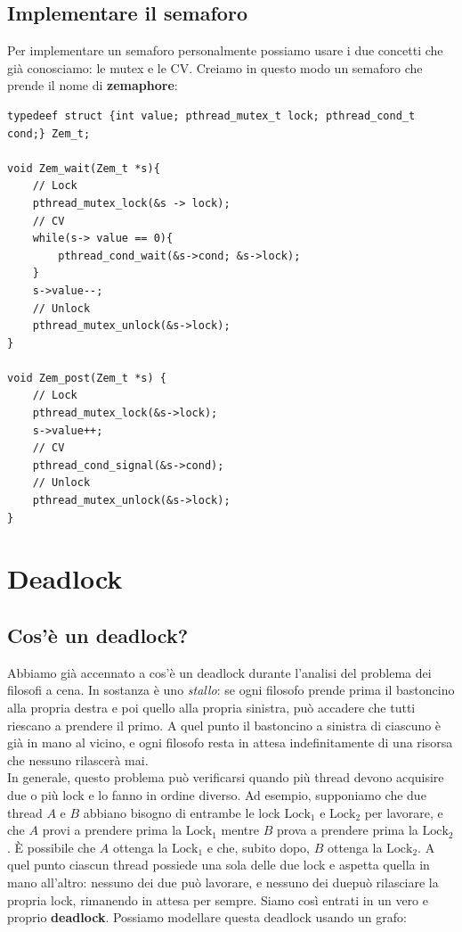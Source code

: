 \documentclass[11pt, a4paper, titlepage, oneside]{scrbook}
\begin{document}
\subsection{Implementare il semaforo}

Per implementare un semaforo personalmente possiamo usare i due concetti che già conosciamo: le mutex e le CV. Creiamo in questo modo un semaforo che prende il nome di \textbf{zemaphore}:

\begin{lstlisting}[style=C]
typedeef struct {int value; pthread_mutex_t lock; pthread_cond_t cond;} Zem_t;

void Zem_wait(Zem_t *s){
    // Lock
    pthread_mutex_lock(&s -> lock);
    // CV
    while(s-> value == 0){
        pthread_cond_wait(&s->cond; &s->lock);
    }
    s->value--;
    // Unlock
    pthread_mutex_unlock(&s->lock);
}

void Zem_post(Zem_t *s) {
    // Lock
    pthread_mutex_lock(&s->lock);
    s->value++;
    // CV
    pthread_cond_signal(&s->cond);
    // Unlock
    pthread_mutex_unlock(&s->lock);
}
\end{lstlisting}

\section{Deadlock}

\subsection{Cos'è un deadlock?}

Abbiamo già accennato a cos'è un deadlock durante l'analisi del problema dei filosofi a cena. In sostanza è uno \textit{stallo}: se ogni filosofo prende prima il bastoncino alla propria destra e poi quello alla propria sinistra, può accadere che tutti riescano a prendere il primo. A quel punto il bastoncino a sinistra di ciascuno è già in mano al vicino, e ogni filosofo resta in attesa indefinitamente di una risorsa che nessuno rilascerà mai. \\ 
In generale, questo problema può verificarsi quando più thread devono acquisire due o più lock e lo fanno in ordine diverso. Ad esempio, supponiamo che due thread $A$ e $B$ abbiano bisogno di entrambe le lock $\text{Lock}_1$ e $\text{Lock}_2$ per lavorare, e che $A$ provi a prendere prima la $\text{Lock}_1$ mentre $B$ prova a prendere prima la $\text{Lock}_2$. È possibile che $A$ ottenga la $\text{Lock}_1$ e che, subito dopo, $B$ ottenga la $\text{Lock}_2$. A quel punto ciascun thread possiede una sola delle due lock e aspetta quella in mano all'altro: nessuno dei due può lavorare, e nessuno dei duepuò rilasciare la propria lock, rimanendo in attesa per sempre. Siamo così entrati in un vero e proprio \textbf{deadlock}. Possiamo modellare questa deadlock usando un grafo:
\end{document}
